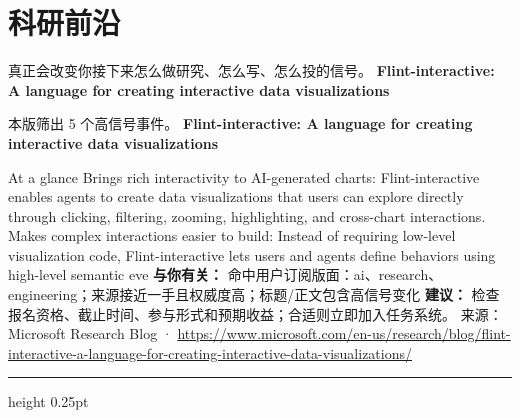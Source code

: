 \documentclass[10.5pt]{ctexart}
\begin{document}
\section*{科研前沿}
{\color{ormuted} 真正会改变你接下来怎么做研究、怎么写、怎么投的信号。}
\vspace{2mm}
{\LARGE\bfseries Flint-interactive: A language for creating interactive data visualizations}\par
\vspace{1mm}
{\color{ormuted} 本版筛出 5 个高信号事件。}
\vspace{3mm}
{\Large\bfseries Flint-interactive: A language for creating interactive data visualizations}\par
At a glance Brings rich interactivity to AI-generated charts: Flint-interactive enables agents to create data visualizations that users can explore directly through clicking, filtering, zooming, highlighting, and cross-chart interactions. Makes complex interactions easier to build: Instead of requiring low-level visualization code, Flint-interactive lets users and agents define behaviors using high-level semantic eve
\textbf{与你有关：} 命中用户订阅版面：ai、research、engineering；来源接近一手且权威度高；标题/正文包含高信号变化
\textbf{建议：} 检查报名资格、截止时间、参与形式和预期收益；合适则立即加入任务系统。
{\footnotesize\color{ormuted} 来源：Microsoft Research Blog · \url{https://www.microsoft.com/en-us/research/blog/flint-interactive-a-language-for-creating-interactive-data-visualizations/}}
\vspace{4mm}
\hrule height 0.25pt
\vspace{3mm}
\end{document}
